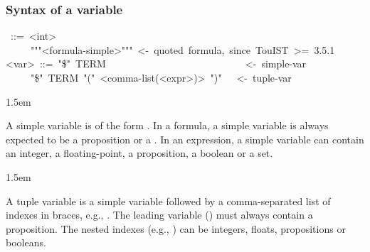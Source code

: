 {\subsubsection{Syntax of a variable}\label{sec-syntax-of-a-variable}%
\begin{mdpre}%
~::=~{\textless{}int\textgreater{}}\\
~~~~\textbar{}~"""{\textless{}formula-simple\textgreater{}}"""~{\textless{}-~quoted~formula,~since~TouIST~\textgreater{}=~3.5.1}\\
{\textless{}var\textgreater{}}~::=~"\$"~TERM~~~~~~~~~~~~~~~~~~~~~~~~~~~~{\textless{}-~simple-var}\\
~~~~\textbar{}~"\$"~TERM~"("~{\textless{}comma-list(\textless{}expr\textgreater{})\textgreater{}}~")"~~~{\textless{}-~tuple-var}%
\end{mdpre}
\begin{mddefinitions}%


\begin{mdbmarginx}{}{}{}{1.5em}%
\begin{mddefdata}%
A simple variable is of the form . In a formula, a simple
variable is always expected to be a proposition or a
. In an expression, a simple
variable can contain an integer, a floating-point, a proposition, a boolean
or a set.
\end{mddefdata}%
\end{mdbmarginx}%


\begin{mdbmarginx}{}{}{}{1.5em}%
\begin{mddefdata}%
A tuple variable is a simple variable followed by a comma-separated list of
indexes in braces, e.g., . The leading variable ()
must always contain a proposition. The nested indexes (e.g., )
can be integers, floats, propositions or booleans.
\end{mddefdata}%
\end{mdbmarginx}%


\end{mddefinitions}}

